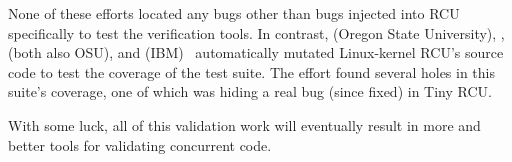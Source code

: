 None of these efforts located any bugs other than bugs injected into
RCU specifically to test the verification tools.
In contrast,
 (Oregon State University), ,
 (both also OSU), and 
(IBM)~\cite{Groce:2015:VMC:2916135.2916190}
automatically mutated Linux-kernel RCU's source code to test the
coverage of the  test suite.
The effort found several holes in this suite's coverage, one of which
was hiding a real bug (since fixed) in Tiny RCU\@.

With some luck, all of this validation work will eventually result in
more and better tools for validating concurrent code.
